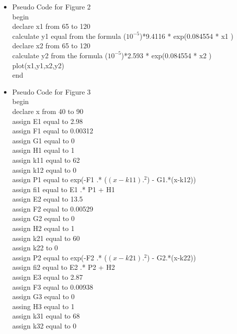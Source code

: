 \documentclass{article}
\begin{document}
\begin{itemize}
    \item Pseudo Code for Figure 2\\
    begin \\
    declare x1 from 65 to 120\\
calculate y1 equal from  the formula ($10^{-5}$)*9.4116 * exp(0.084554 * x1  )\\
declare x2 from 65 to 120\\
calculate y2 from the formula ($10^{-5}$)*2.593 * exp(0.084554 * x2  )\\
plot(x1,y1,x2,y2)\\
end\\
\item Pseudo Code for Figure 3\\
begin\\
declare x from 40 to 90\\
assign E1 equal to 2.98\\
assign F1 equal to 0.00312 \\
assign G1 equal to 0\\
assign H1 equal to 1\\
assign k11 equal to 62\\
assign k12 equal to 0\\
assign P1 equal  to exp(-F1 .* ($(x-k11).^2$) - G1.*(x-k12)) \\
assign fi1 equal to  E1 .* P1 + H1 \\
assign E2 equal to 13.5\\
assign F2 equal to 0.00529\\
assign G2 equal to 0\\
assign H2 equal to 1\\
assign k21 equal to 60\\
assign k22 to 0\\
assign P2 equal to exp(-F2 .* ($(x-k21).^2$) - G2.*(x-k22))\\
assign fi2 equal to E2 .* P2 + H2\\

assign E3 equal to 2.87\\
assign F3 equal to 0.00938\\
assign G3 equal to 0\\
assing H3 equal to 1\\
assign k31 equal to 68\\
assign k32 equal to 0\\


\end{itemize}
\end{document}
